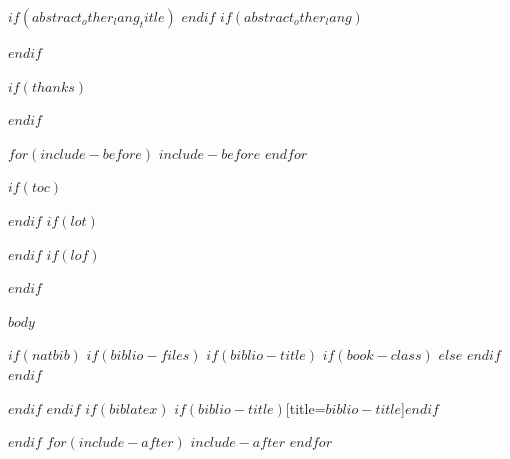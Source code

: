 \documentclass[$if(fontsize)$$fontsize$,$endif$$if(lang)$$lang$,$endif$$if(papersize)$$papersize$,$endif$$for(classoption)$$classoption$$sep$,$endfor$]{$documentclass$}
\begin{document}
$if(abstract_other_lang_title)$
\renewcommand{\abstractname}{$abstract_other_lang_title$}
$endif$
$if(abstract_other_lang)$
\begin{abstract}
$abstract_other_lang$
\end{abstract}
$endif$

$if(thanks)$
\renewcommand{\abstractname}{Danksagung}
\begin{abstract}
$thanks$
\end{abstract}
\clearpage\mbox{}\thispagestyle{empty}\clearpage
$endif$

$for(include-before)$
$include-before$
$endfor$

\setcounter{page}{1}

$if(toc)$
{
\hypersetup{linkcolor=black}
\setcounter{tocdepth}{$toc-depth$}
\tableofcontents
}

$endif$
$if(lot)$
\newpage
\listoftables
$endif$
$if(lof)$
\newpage
\listoffigures
$endif$

\clearpage\mbox{}\thispagestyle{empty}\clearpage
{}                  %
\setcounter{page}{1}

$body$

$if(natbib)$
$if(biblio-files)$
$if(biblio-title)$
$if(book-class)$
\renewcommand\bibname{$biblio-title$}
$else$
\renewcommand\refname{$biblio-title$}
$endif$
$endif$


$endif$
$endif$
$if(biblatex)$
\printbibliography$if(biblio-title)$[title=$biblio-title$]$endif$

$endif$
$for(include-after)$
$include-after$
$endfor$

\newpage

\end{document}
